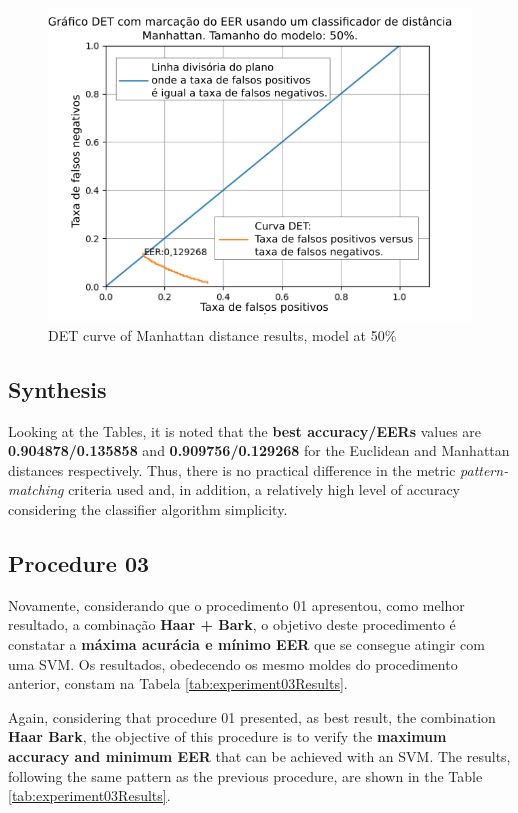 \begin{figure}[!ht]
	\centering
	\includegraphics[width=.9\linewidth]{images/results/det/DET_for_classifier_Manhattan_50}
	\caption{DET curve of Manhattan distance results, model at 50\%}
	\label{fig:detforclassifiermanhattan50}
\end{figure}

\subsection{Synthesis}
\par Looking at the Tables, it is noted that the \textbf{best accuracy/EERs} values are \textbf{0.904878/0.135858} and \textbf{0.909756/0.129268} for the Euclidean and Manhattan distances respectively. Thus, there is no practical difference in the metric \textit{pattern-matching} criteria used and, in addition, a relatively high level of accuracy considering the classifier algorithm simplicity.

\subsection{Procedure 03}
\label{chap:testsResults:sec:Experimento03}
\par Novamente, considerando que o procedimento 01 apresentou, como melhor resultado, a combinação \textbf{Haar + Bark}, o objetivo deste procedimento é constatar a \textbf{máxima acurácia e mínimo EER} que se consegue atingir com uma SVM. Os resultados, obedecendo os mesmo moldes do procedimento anterior, constam na Tabela \ref{tab:experiment03Results}.

\par Again, considering that procedure 01 presented, as best result, the combination \textbf{Haar Bark}, the objective of this procedure is to verify the \textbf{maximum accuracy and minimum EER} that can be achieved with an SVM. The results, following the same pattern as the previous procedure, are shown in the Table \ref{tab:experiment03Results}.


